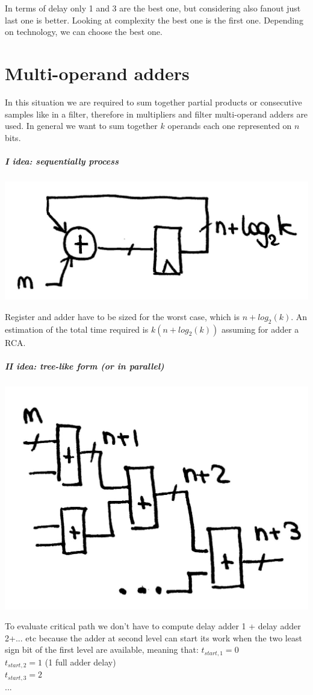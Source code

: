 In terms of delay only 1 and 3 are the best one, but considering also fanout just last one is better. Looking at complexity the best one is the first one. Depending on technology, we can choose the best one.

\section{Multi-operand adders}

In this situation we are required to sum together partial products or consecutive samples like in a filter, therefore in multipliers and filter multi-operand adders are used. In general we want to sum together $k$ operands each one represented on $n$ bits.

\subparagraph{I idea: sequentially process}
\begin{center}
  \includegraphics[width=0.5\linewidth]{img/img2/24}
\end{center}

Register and adder have to be sized for the worst case, which is $n+log_2(k)$. An estimation of the total time required is $k(n+log_2(k))$ assuming for adder a RCA.

\subparagraph{II idea: tree-like form  (or in parallel)}
\begin{center}
  \includegraphics[width=0.5\linewidth]{img/img2/25}
\end{center}

To evaluate critical path we don't have to compute delay adder 1 + delay adder 2+... etc because the adder at second level can start its work when the two least sign bit of the first level are available, meaning that:
$t_{start,1}=0$\\
$t_{start,2}=1$ (1 full adder delay)\\
$t_{start,3}=2$\\
$...$\\

